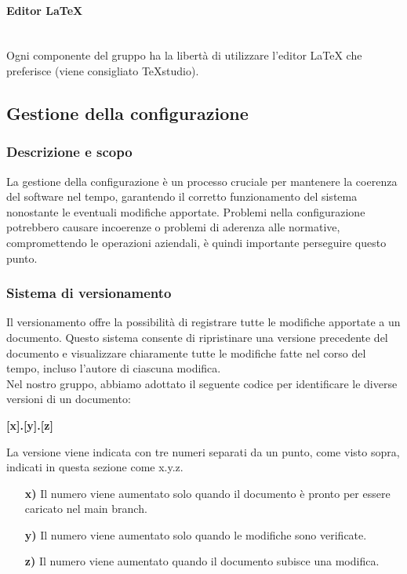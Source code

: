 \documentclass{article}
\begin{document}
\paragraph{Editor LaTeX}~\\
Ogni componente del gruppo ha la libertà di utilizzare l'editor LaTeX che preferisce (viene consigliato TeXstudio).

\subsection{Gestione della configurazione}
    \subsubsection{Descrizione e scopo}
    La gestione della configurazione è un processo cruciale per mantenere la coerenza del software nel tempo, garantendo il corretto funzionamento del sistema nonostante le eventuali modifiche apportate. Problemi nella configurazione potrebbero causare incoerenze o problemi di aderenza alle normative, compromettendo le operazioni aziendali, è quindi importante perseguire questo punto.
    
    \subsubsection{Sistema di versionamento}
    Il versionamento offre la possibilità di registrare tutte le modifiche apportate a un documento. Questo sistema consente di ripristinare una versione precedente del documento e visualizzare chiaramente tutte le modifiche fatte nel corso del tempo, incluso l'autore di ciascuna modifica.\\
    Nel nostro gruppo, abbiamo adottato il seguente codice per identificare le diverse versioni di un documento:
    \begin{center}
    \textbf{[x].[y].[z]}
    \end{center}
    La versione viene indicata con tre numeri separati da un punto, come visto sopra, indicati in questa sezione come x.y.z.
    \begin{itemize}
    \item[\textbf{x)}] Il numero viene aumentato solo quando il documento è pronto per essere caricato nel main branch.
    \item[\textbf{y)}] Il numero viene aumentato solo quando le modifiche sono verificate.
    \item[\textbf{z)}] Il numero viene aumentato quando il documento subisce una modifica.
    \end{itemize}  
    
\end{document}
